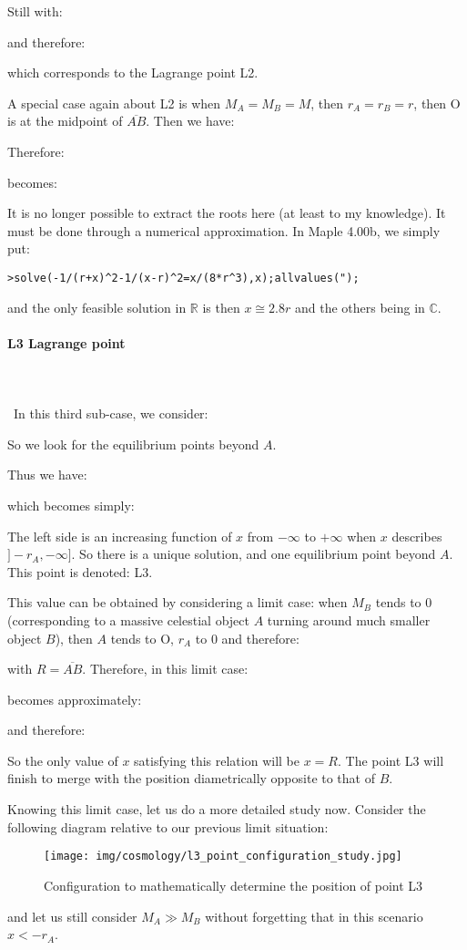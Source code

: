	Still with:
	
	and therefore:
	
	which corresponds to the Lagrange point L2.

	A special case again about L2 is when $M_A=M_B=M$, then $r_A=r_B=r$, then O is at the midpoint of $\overline{AB}$. Then we have:
	
	Therefore:
	
	becomes:
	
	It is no longer possible to extract the roots here (at least to my knowledge). It must be done through a numerical approximation. In Maple 4.00b, we simply put:

	\texttt{>solve(-1/(r+x)\string^2-1/(x-r)\string^2=x/(8*r\string^3),x);allvalues(");}
	
	and the only feasible solution in $\mathbb{R}$ is then $x\cong 2.8r$ and the others being in $\mathbb{C}$.
	
	\pagebreak
	\paragraph{L3 Lagrange point}\mbox{}\\\\\
	In this third sub-case, we consider:
	
	So we look for the equilibrium points beyond $A$.

	Thus we have:
	
	which becomes simply:
	
	The left side is an increasing function of $x$ from $-\infty$ to $+\infty$ when $x$ describes $]-r_A,-\infty]$. So there is a unique solution, and one equilibrium point beyond $A$. This point is denoted: L3.

	This value can be obtained by considering a limit case: when $M_B$ tends to $0$ (corresponding to a massive celestial object $A$ turning around much smaller object $B$), then $A$ tends to O, $r_A$ to 0 and therefore:
	
	with $R=\overline{AB}$. Therefore, in this limit case:
	
	becomes approximately:
	
	and therefore:
	
	So the only value of $x$ satisfying this relation will be $x=R$. The point L3 will finish to merge with the position diametrically opposite to that of $B$.

	Knowing this limit case, let us do a more detailed study now. Consider the following diagram relative to our previous limit situation:
	\begin{figure}[H]
		\begin{center}
		\texttt{[image: img/cosmology/l3\_point\_configuration\_study.jpg]}
		\end{center}	
		\caption[]{Configuration to mathematically determine the position of point L3}
	\end{figure}
	and let us still consider $M_A \gg M_B$ without forgetting that in this scenario $x<-r_A$.

